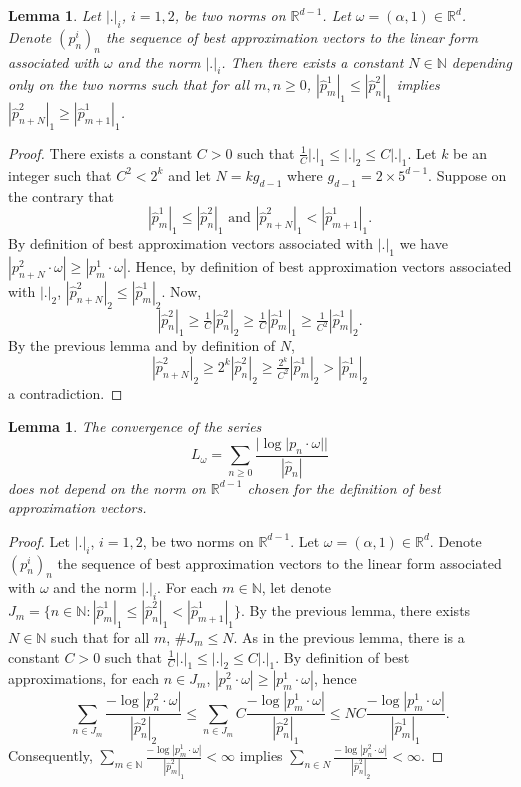 \documentclass[12pt,reqno,a4paper]{amsart}%
\numberwithin{equation}{section}
\newtheorem{lemma}[theorem]{Lemma}
\newcommand{\Nn}{{\mathbb{N}}}
\newcommand{\Rr}{{\mathbb{R}}}
\begin{document}
	\begin{lemma}
		Let $|.|_i$, $i=1,2$, be two norms on $\Rr^{d-1}$. Let $\omega=(\alpha,1)\in\Rr^d$. Denote $(p^i_n)_n$ the sequence of best approximation vectors to the linear form associated with $\omega$ and the norm $|.|_i$. Then there exists a constant $N\in\Nn$ depending only on the two norms such that for all $m,n\geq 0$, $|\hat p^1_m|_1\leq |\hat p^2_n|_1$ implies $|\hat p^2_{n+N}|_1\geq |\hat p^1_{m+1}|_1$.    
	\end{lemma}	
	\begin{proof}
		There exists a constant $C>0$ such that $\frac1C |.|_1\leq |.|_2\leq C|.|_1$. Let $k$ be an integer such that $C^2 < 2^k$ and let $N=kg_{d-1}$ where $g_{d-1}=2\times 5^{d-1}$.   Suppose on the contrary that 
		\[
		|\hat p^1_m|_1\leq |\hat p^2_n|_1 \text{ and } |\hat p^2_{n+N}|_1< |\hat p^1_{m+1}|_1.
		\]
		By definition of best approximation vectors associated with $|.|_1$ we have $|p^2_{n+N}\cdot\omega|\geq |p^1_m\cdot\omega|$. Hence, by definition of best approximation vectors associated with $|.|_2$, $|\hat p^2_{n+N}|_2\leq |\hat p^1_m|_2$. Now, 
		\[
		|\hat p^2_{n}|_1\geq \tfrac1C |\hat p^2_{n}|_2\geq \tfrac1C |\hat p^1_{m}|_1\geq \tfrac1{C^2}|\hat p^1_{m}|_2.
		\]
		By the previous lemma and by definition of $N$,
		\[
		|\hat p^2_{n+N}|_2\geq 2^k|\hat p^2_{n}|_2\geq \tfrac{2^k}{C^2}|\hat p^1_{m}|_2>|\hat p^1_{m}|_2
		\]
		a contradiction.
	\end{proof}
	
	\begin{lemma}
		The convergence of the series 
		$$
		L_{\omega}= \sum_{n\geq0} \frac{|\log|p_n\cdot\omega||}{|\hat p_n|}
		$$ does not depend on the norm on $\Rr^{d-1}$ chosen for the definition of best approximation vectors.
	\end{lemma}
	\begin{proof}
		Let $|.|_i$, $i=1,2$, be two norms on $\Rr^{d-1}$. Let $\omega=(\alpha,1)\in\Rr^d$. Denote $(p^i_n)_n$ the sequence of best approximation vectors to the linear form associated with $\omega$ and the norm $|.|_i$. For each $m\in\Nn$, let denote $J_m=\{n\in\Nn:|\hat p^1_{m}|_1\leq |\hat p^2_{n}|_1<  |\hat p^1_{m+1}|_1\}$. By the previous lemma, there exists $N\in\Nn$ such that for all $m$, $\# J_m\leq N$. As in the previous lemma, there is a constant $C>0$ such that $\frac1C |.|_1\leq |.|_2\leq C|.|_1$. By definition of best approximations, for each $n\in J_m$, $|p^2_n\cdot\omega|\geq|p^1_m\cdot\omega|$, hence
		\[
		\sum_{n\in J_m}\frac{-\log|p^2_n\cdot\omega|}{|\hat p^2_n|_2}\leq \sum_{n\in J_m}C\frac{-\log|p^1_m\cdot\omega|}{|\hat p^2_n|_1}\leq NC\frac{-\log|p^1_m\cdot\omega|}{|\hat p^1_m|_1}.  
		\]  
		Consequently, $\sum_{m\in \Nn}\frac{-\log|p^1_m\cdot\omega|}{|\hat p^2_m|_1}<\infty$ implies $\sum_{n\in N}\frac{-\log|p^2_n\cdot\omega|}{|\hat p^2_n|_2}<\infty$.
	\end{proof}
	
\end{document}
